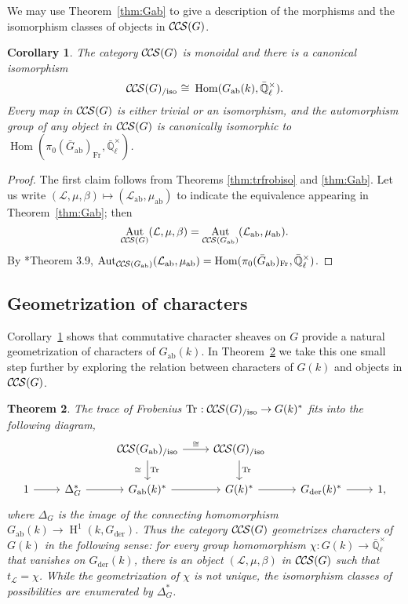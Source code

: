 \documentclass[10pt]{amsart}
\theoremstyle{plain}
\newtheorem{theorem}{Theorem}[section]
\newtheorem{corollary}[theorem]{Corollary}
\theoremstyle{definition}
\newcommand{\EE}{\mathbb{\bar Q}_\ell}
\newcommand{\Fq}{k}
\newcommand{\EEx}{\EE^\times}
\newcommand{\Frob}[1]{\operatorname{Fr}_{#1}}
\DeclareMathOperator{\Aut}{Aut}
\DeclareMathOperator{\Hom}{Hom}
\DeclareMathOperator{\Hh}{H}
\newcommand{\der}{_{\operatorname{der}}}
\newcommand{\ab}{_{\operatorname{ab}}}
\newcommand{\iso}{{\ \cong\ }}
\newcommand{\trFrob}[1]{t_{#1}}
\DeclareMathOperator{\Tr}{Tr}
\newcommand{\TrFrob}[1]{\Tr_{#1}}
\newcommand{\cs}[1]{{\mathcal{#1}}}
\newcommand{\CCS}{{\mathcal{C\hskip-.8pt C\hskip-0.8pt S}}}
\newcommand{\CCSiso}[1]{\CCS(#1)_{/\text{iso}}}
\begin{document}
We may use Theorem~\ref{thm:Gab} to give a description of the morphisms and the isomorphism classes of objects in $\CCS(G)$. 

\begin{corollary}\label{cor:Gab}
The category $\CCS(G)$ is monoidal and there is a canonical isomorphism
\[
\CCSiso{G} \iso \Hom(G\ab(\Fq),\EEx).
\]
Every map in $\CCS(G)$ is either trivial or an isomorphism, and the automorphism group of any object in $\CCS(G)$ is canonically
isomorphic to $\Hom(\pi_0(\bar{G}\ab)_{\Frob{}},\EEx)$.
\end{corollary}

\begin{proof}
The first claim follows from Theorems \ref{thm:trfrobiso} and \ref{thm:Gab}. Let us write $(\cs{L},\mu,\beta) \mapsto (\cs{L}\ab,\mu\ab)$ to indicate the equivalence appearing in Theorem~\ref{thm:Gab};
then \[\Aut_{\CCS(G)}(\cs{L},\mu,\beta) = \Aut_{\CCS(G\ab)}(\cs{L}\ab,\mu\ab).\] 
By \cite{cunningham-roe:13a}*{Theorem 3.9},  $\Aut_{\CCS(G\ab)}(\cs{L}\ab,\mu\ab) = \Hom(\pi_0(\bar{G}\ab)_{\Frob{}},\EEx)$.
\end{proof}

\subsection{Geometrization of characters} \label{ssec:geo}

Corollary~\ref{cor:Gab} shows that commutative character sheaves on $G$ provide a natural geometrization of characters of $G\ab(k)$. In Theorem~\ref{thm:geo} we take this one small step further by exploring the relation between characters of $G(k)$ and objects in $\CCS(G)$. 

\begin{theorem}\label{thm:geo}
The trace of Frobenius $\TrFrob{} : \CCSiso{G}\to G(\Fq)^*$ fits into the following diagram,
\[
\begin{tikzcd}
\ & & \CCSiso{G\ab} \arrow{d}{\TrFrob{}}[swap]{\iso} \arrow{r}{\iso} & \CCSiso{G} \arrow{d}{\TrFrob{}}& \\
1 \arrow{r} & \Delta_G^* \arrow{r} & G\ab(k)^* \arrow{r} & G(k)^* \arrow{r} & G\der(k)^* \arrow{r} & 1,
\end{tikzcd}
\]
where $\Delta_G$ is the image of the connecting homomorphism $G\ab(\Fq) \to \Hh^1(\Fq, G\der)$. 
Thus the category $\CCS(G)$ geometrizes characters of $G(\Fq)$ in the following sense: for every group homomorphism $\chi : G(\Fq) \to \EEx$ that vanishes on $G\der(\Fq)$, there is an object $(\cs{L},\mu,\beta)$ in $\CCS(G)$ such that $\trFrob{\cs{L}} = \chi$. 
While the geometrization of $\chi$ is not unique, the isomorphism classes of possibilities are enumerated by $\Delta_G^*$.
\end{theorem}
\end{document}
